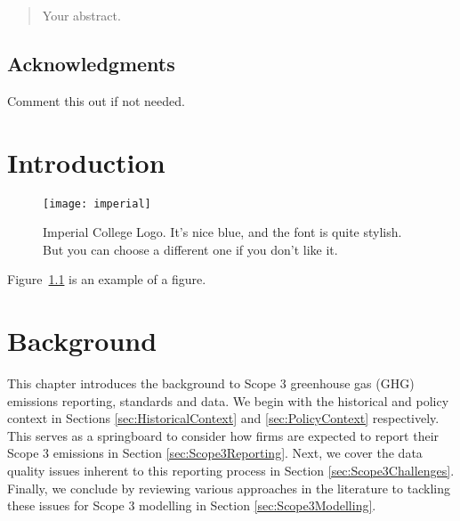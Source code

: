 \documentclass[12pt,twoside]{report}
\date{September 2024}
\begin{document}



\clearpage{\pagestyle{empty}\cleardoublepage}
\setcounter{page}{1}
\pagestyle{fancy}

\begin{abstract}
Your abstract.
\end{abstract}

\cleardoublepage
\section*{Acknowledgments}
Comment this out if not needed.

\clearpage{\pagestyle{empty}\cleardoublepage}

\tableofcontents 


\clearpage{\pagestyle{empty}\cleardoublepage}
\setcounter{page}{1}
\fancyhead[LE,RO]{\slshape \rightmark}
\fancyhead[LO,RE]{\slshape \leftmark}

\chapter{Introduction}

\begin{figure}[tb]
\centering
\texttt{[image: imperial]}
\caption{Imperial College Logo. It's nice blue, and the font is quite stylish. But you can choose a different one if you don't like it.}
\label{fig:logo}
\end{figure}

Figure~\ref{fig:logo} is an example of a figure. 

\chapter{Background}

This chapter introduces the background to Scope 3 greenhouse gas (GHG) emissions reporting, standards and data. We begin with the historical and policy context in Sections \ref{sec:HistoricalContext} and \ref{sec:PolicyContext} respectively. This serves as a springboard to consider how firms are expected to report their Scope 3 emissions in Section \ref{sec:Scope3Reporting}. Next, we cover the data quality issues inherent to this reporting process in Section \ref{sec:Scope3Challenges}. Finally, we conclude by reviewing various approaches in the literature to tackling these issues for Scope 3 modelling in Section \ref{sec:Scope3Modelling}. 
\end{document}

